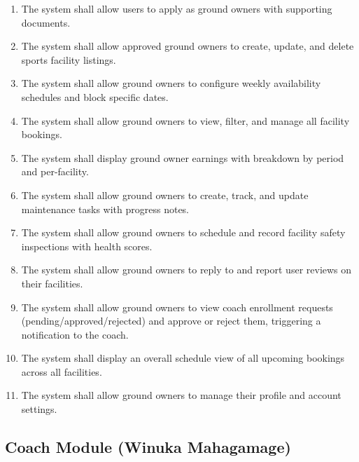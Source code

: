 \documentclass[12pt,a4paper]{report}
\begin{document}
\begin{enumerate}[leftmargin=1.5cm]
  \item The system shall allow users to apply as ground owners with supporting documents.
  \item The system shall allow approved ground owners to create, update, and delete sports facility listings.
  \item The system shall allow ground owners to configure weekly availability schedules and block specific dates.
  \item The system shall allow ground owners to view, filter, and manage all facility bookings.
  \item The system shall display ground owner earnings with breakdown by period and per-facility.
  \item The system shall allow ground owners to create, track, and update maintenance tasks with progress notes.
  \item The system shall allow ground owners to schedule and record facility safety inspections with health scores.
  \item The system shall allow ground owners to reply to and report user reviews on their facilities.
  \item The system shall allow ground owners to view coach enrollment requests (pending/approved/rejected) and approve or reject them, triggering a notification to the coach.
  \item The system shall display an overall schedule view of all upcoming bookings across all facilities.
  \item The system shall allow ground owners to manage their profile and account settings.
\end{enumerate}

\subsection{Coach Module (Winuka Mahagamage)}
\end{document}
